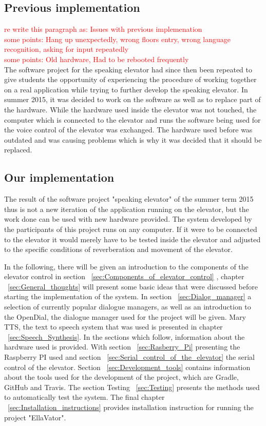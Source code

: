 \documentclass[a4paper, 12pt]{article}
\newcommand\todo[1]{\textcolor{red}{#1}}
\begin{document}
\subsection{Previous implementation}
\todo{re write this paragraph as: Issues with previous implemenation}\\
\todo{some points: Hang up unexpectedly, wrong floors entry, wrong language recognition, asking for input repeatedly}\\
\todo{some points: Old hardware, Had to be rebooted frequently}\\
The software project for the speaking elevator had since then been repeated to give students the opportunity 
of experiencing the procedure of working together on a real application while trying to further develop the speaking elevator.
In summer 2015, it was decided to work on the software as well as to replace part of the hardware.
While the hardware used inside the elevator was not touched, the computer which is connected to the elevator and runs the software being used for the voice control of the elevator was exchanged.
The hardware used before was outdated and was causing problems which is why it was decided that it should be replaced. \newline

\subsection{Our implementation}
The result of the software project "speaking elevator" of the summer term 2015
thus is not a new iteration of the application running on the elevator, but the
work done can be used with new hardware provided.
The system developed by the participants of this project runs on any computer.
If it were to be connected to the elevator it would merely have to be tested inside the elevator and adjusted to the specific conditions of reverberation and movement of the elevator. \newline

In the following, there will be given an introduction to the components of the elevator control in section  ~\ref{sec:Components_of_elevator_control} , chapter ~\ref{sec:General_thoughts} will present some basic ideas that were discussed before starting the implementation of the system.
In section ~\ref{sec:Dialog_manager} a selection of currently popular dialogue managers, as well as an introduction to the OpenDial, the dialogue manager used for the project will be given.
Mary TTS, the text to speech system that was used is presented in chapter ~\ref{sec:Speech_Synthesis}. \newline
In the sections which follow, information about the hardware used is provided.
With section ~\ref{sec:Rasberry_Pi} presenting the Raspberry PI used and section ~\ref{sec:Serial_control_of_the_elevator} the serial control of the elevator.
Section ~\ref{sec:Development_tools} contains information about the tools used for the development of the project, which are Gradle, GitHub and Travis.
The section Testing ~\ref{sec:Testing} presents the methods used to automatically test the system.
The final chapter ~\ref{sec:Installation_instructions} provides installation instruction for running the project "EllaVator".
\end{document}
